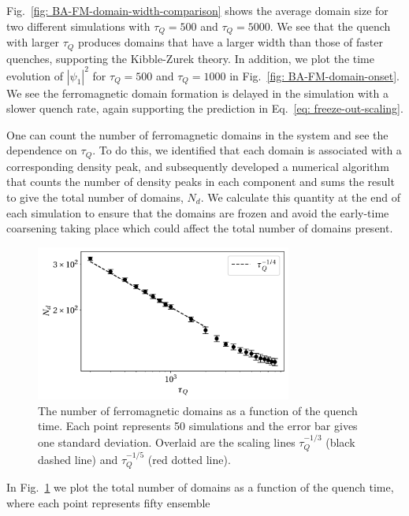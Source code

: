 Fig.~\ref{fig: BA-FM-domain-width-comparison} shows the average domain size
for two different simulations with \(\tau_Q=500\) and \(\tau_Q=5000\).
We see that the quench with larger \(\tau_Q\) produces domains that have a
larger width than those of faster quenches, supporting the Kibble-Zurek theory.
In addition, we plot the time evolution of \(|\psi_1|^2\) for \(\tau_Q=500\)
and \(\tau_Q=1000\) in Fig.~\ref{fig: BA-FM-domain-onset}.
We see the ferromagnetic domain formation is delayed in the simulation
with a slower quench rate, again supporting the prediction in
Eq.~\eqref{eq: freeze-out-scaling}.

One can count the number of ferromagnetic domains in the system and see the
dependence on \( \tau_Q \).
To do this, we identified that each domain is associated with a corresponding
density peak, and subsequently developed a numerical algorithm that counts the
number of density peaks in each component and sums the result to give the total
number of domains, \(N_d\).
We calculate this quantity at the end of each simulation to ensure that the
domains are frozen and avoid the early-time coarsening taking place which could
affect the total number of domains present.
\begin{figure}[htb!]
    \centering
    \includegraphics[width=0.75\textwidth]{gfx/ch-spin1/FM_domains_scaling.pdf}
    \caption[Total ferromagnetic domains in the system versus the quench rate
        \(\tau_Q\)]
    {The number of ferromagnetic domains as a function of the
        quench time. Each point represents 50 simulations and the
        error bar gives one standard deviation. Overlaid are the scaling lines
        \(\tau_Q^{-1/3}\) (black dashed line) and \(\tau_Q^{-1/5}\)
        (red dotted line).\label{fig: FM-domains-scaling}}
\end{figure}
In Fig.~\ref{fig: FM-domains-scaling} we plot the total number of domains
as a function of the quench time, where each point represents fifty ensemble
